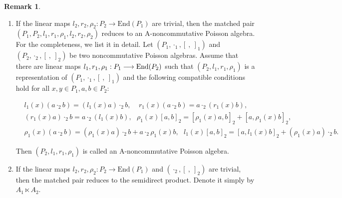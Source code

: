 \documentclass[12pt]{amsart}
\theoremstyle{definition}
\newtheorem{rmk}[thm]{Remark}
\begin{document}
\begin{rmk} \label{La} \begin{enumerate}
\item If the linear maps
 $l_{2},r_{2},\rho_2: P_{2}\rightarrow \text{End}(P_1)$ are trivial, then the matched pair $(P_{1},P_{2},l_{1},r_{1},\rho_1,l_{2},r_{2},\rho_2)$
reduces to an A-noncommutative Poisson algebra. 
For the completeness, we list it in detail. Let $(P_1,\cdot_1,[ \ , \ ]_{1})$ and
$(P_2,\cdot_2,[ \ , \ ]_{2})$ be two noncommutative Poisson algebras. Assume that there are linear maps
$l_{1},r_{1},\rho_1:P_1\longrightarrow \hbox{End}(P_2)$
 such that
$(P_2,l_{1},r_{1},\rho_1)$ is a representation of  $(P_1,\cdot_1,[ \ , \ ]_{1})$ and
the following compatible conditions hold for all $x,y\in P_1,a,b\in P_2$:
\begin{small}
	\begin{align*}&l_1(x)(a\cdot_2 b)=(l_{1}(x)a)\cdot_2 b, \ \ \  \ \ r_1(x)(a\cdot_2 b)=a\cdot_2 (r_{1}(x)b),
\\&(r_{1}(x)a)\cdot_2 b=a\cdot_2 (l_{1}(x)b), \ \ \ \rho_1(x)[a,b]_2=[\rho_1(x)a,b]_2+[a,\rho_1(x)b]_2,
	\\& \rho_1(x)(a\cdot_2 b)=(\rho_{1}(x)a)\cdot_2 b+a\cdot_2 \rho_{1}(x)b,\ \ \ 
 l_{1}(x)[a,b]_{2}=[a,l_{1}(x)b]_{2}+(\rho_{1}(x)a)\cdot_2 b.
\end{align*}
\end{small}
 Then $(P_{2},l_{1},r_{1},\rho_1)$ is called
  an A-noncommutative Poisson algebra.
  \item If the linear maps
 $l_{2},r_{2},\rho_2: P_{2}\rightarrow \text{End}(P_1)$ and $(\cdot_2,[ \ , \ ]_{2})$ are trivial, 
 then the matched pair 
reduces to the semidirect product. Denote it simply by $A_{1}\ltimes A_2$.
  \end{enumerate}
\end{rmk}
\end{document}
